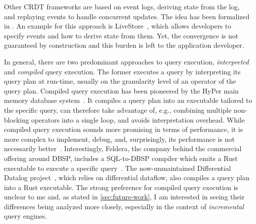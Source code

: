 Other \ac{CRDT} frameworks are based on event logs, deriving state from the log,
and replaying events to handle concurrent updates.
The idea has been formalized in \cite{egwalker}.
An example for this approach is LiveStore~\cite{livestore}, which allows
developers to specify events and how to derive state from them.
Yet, the convergence is not guaranteed by construction and this burden is
left to the application developer.

In general, there are two predominant approaches to query execution,
\emph{interpreted} and \emph{compiled} query execution.
The former executes a query by interpreting its query plan at run-time,
usually on the granularity level of an operator of the query plan.
Compiled query execution has been pioneered by the HyPer main memory database
system~\cite{neumann2011efficiently}.
It compiles a query plan into an executable tailored to the specific query,
can therefore take advantage of, e.g., combining multiple non-blocking operators
into a single loop, and avoids interpretation overhead.
While compiled query execution sounds more promising in terms of performance,
it is more complex to implement, debug, and, surprisingly, its performance
is not necessarily better~\cite{kersten2018everything}.
Interestingly, Feldera, the company behind the commercial offering around DBSP,
includes a SQL-to-DBSP compiler which emits a Rust executable to execute a
specific query~\cite{feldera}.
The now-unmaintained Differential Datalog project~\cite{ddlog},
which relies on differential dataflow, also compiles a query plan into a
Rust executable.
The strong preference for compiled query execution is unclear to me and,
as stated in \ref{sec:future-work}, I am interested in seeing their differences
being analyzed more closely, especially in the context of \emph{incremental}
query engines.
